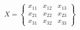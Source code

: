     \begin{center}
        \begin{equation*}
            X =
            \begin{Bmatrix}
                x_{11} & x_{12} & x_{13} \\
                x_{21} & x_{22} & x_{23} \\
                x_{31} & x_{32} & x_{33}
            \end{Bmatrix}
        \end{equation*}
    \end{center}
